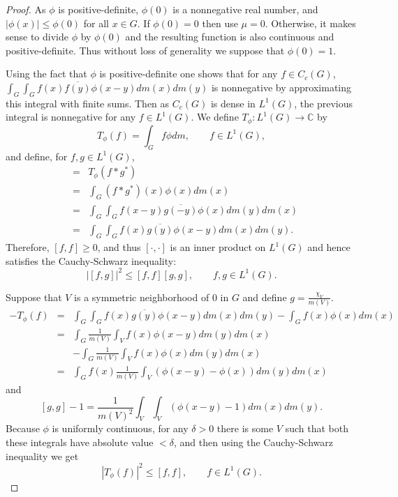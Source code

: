 \documentclass{article}
\begin{document}
\begin{proof}
As $\phi$ is positive-definite, $\phi(0)$ is a nonnegative real number, and $|\phi(x)| \leq \phi(0)$ for all $x \in G$. If $\phi(0)=0$ then
use $\mu=0$. Otherwise, it makes sense to divide $\phi$ by $\phi(0)$ and the resulting function is also continuous and positive-definite. 
Thus without loss of generality we suppose that $\phi(0)=1$. 

Using the fact that $\phi$ is positive-definite one shows that for any $f \in C_c(G)$,
$\int_G \int_G f(x) \overline{f(y)} \phi(x-y) dm(x) dm(y)$ is nonnegative
by approximating this integral with finite sums. Then as $C_c(G)$ is dense in $L^1(G)$, the previous integral is nonnegative for any
$f\in L^1(G)$. We define $T_\phi:L^1(G) \to \mathbb{C}$ by
\[
T_\phi(f) = \int_G f \phi dm, \qquad f \in L^1(G),
\]
and define, for $f,g \in L^1(G)$,
\begin{eqnarray*}
[f,g] &=& T_\phi(f* g^*)\\
& =& \int_G (f*g^*)(x) \phi(x) dm(x)\\
&=&\int_G \int_G f(x-y) \overline{g(-y)} \phi(x) dm(y) dm(x)\\
&=&\int_G \int_G f(x) \overline{g(y)} \phi(x-y) dm(x) dm(y).
\end{eqnarray*}
Therefore, $[f,f] \geq 0$, and thus  $[\cdot,\cdot]$ is an inner product on $L^1(G)$ and hence satisfies the Cauchy-Schwarz inequality:
\[
|[f,g]|^2 \leq [f,f] [g,g], \qquad f,g \in L^1(G).
\]

Suppose that $V$ is a symmetric neighborhood of $0$ in $G$ and define $g = \frac{\chi_V}{m(V)}$. 
\begin{eqnarray*}
[f,g]-T_\phi(f)&=&\int_G \int_G f(x) \overline{g(y)} \phi(x-y) dm(x)dm(y) - \int_G f(x) \phi(x) dm(x)\\
&=&\int_G \frac{1}{m(V)} \int_V f(x) \phi(x-y) dm(y)dm(x) \\
&&- \int_G \frac{1}{m(V)} \int_V f(x) \phi(x) dm(y) dm(x)\\
&=&\int_G f(x) \frac{1}{m(V)} \int_V (\phi(x-y)-\phi(x)) dm(y) dm(x)
\end{eqnarray*}
and
\[
[g,g]-1 = \frac{1}{m(V)^2} \int_V \int_V (\phi(x-y)-1) dm(x)dm(y).
\]
Because $\phi$ is uniformly continuous, for any $\delta>0$ there is some $V$ such that both these integrals have absolute value $<\delta$,
and then using the Cauchy-Schwarz inequality we get
\begin{equation}
|T_\phi(f)|^2 \leq [f,f], \qquad f \in L^1(G).
\label{Tphi}
\end{equation}


\end{proof}
\end{document}
